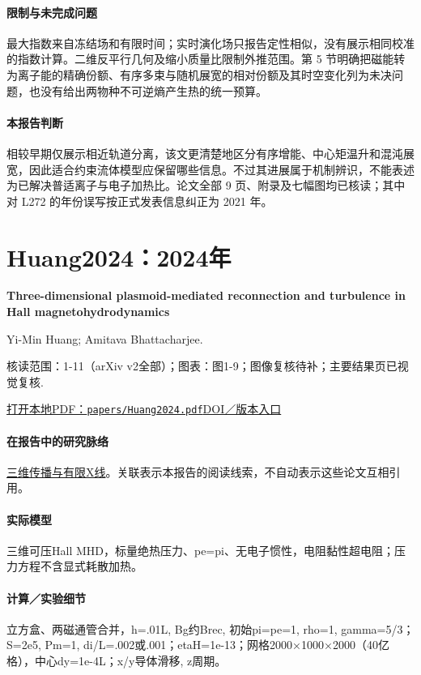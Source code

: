 \paragraph{限制与未完成问题}最大指数来自冻结场和有限时间；实时演化场只报告定性相似，没有展示相同校准的指数计算。二维反平行几何及缩小质量比限制外推范围。第 5 节明确把磁能转为离子能的精确份额、有序多束与随机展宽的相对份额及其时空变化列为未决问题，也没有给出两物种不可逆熵产生热的统一预算。

\paragraph{本报告判断}相较早期仅展示相近轨道分离，该文更清楚地区分有序增能、中心矩温升和混沌展宽，因此适合约束流体模型应保留哪些信息。不过其进展属于机制辨识，不能表述为已解决普适离子与电子加热比。论文全部 9 页、附录及七幅图均已核读；其中对 L272 的年份误写按正式发表信息纠正为 2021 年。

\section{Huang2024：2024年}\label{paper:Huang2024}

\textbf{Three-dimensional plasmoid-mediated reconnection and turbulence in Hall magnetohydrodynamics}\citep{Huang2024}\

Yi-Min Huang;  Amitava Bhattacharjee.

\textsf{核读范围：}1-11（arXiv v2全部）；\textsf{图表：}图1-9；图像复核待补；主要结果页已视觉复核.

\href{run:papers/Huang2024.pdf}{打开本地PDF：\texttt{papers/Huang2024.pdf}}\quad\href{https://doi.org/10.1063/5.0216561}{DOI／版本入口}

\paragraph{在报告中的研究脉络}\hyperref[story:three]{三维传播与有限X线}。关联表示本报告的阅读线索，不自动表示这些论文互相引用。

\paragraph{实际模型}三维可压Hall MHD，标量绝热压力、pe=pi、无电子惯性，电阻黏性超电阻；压力方程不含显式耗散加热。

\paragraph{计算／实验细节}立方盒、两磁通管合并，h=.01L, Bg约Brec, 初始pi=pe=1, rho=1, gamma=5/3；S=2e5, Pm=1, di/L=.002或.001；etaH=1e-13；网格2000×1000×2000（40亿格），中心dy=1e-4L；x/y导体滑移, z周期。

